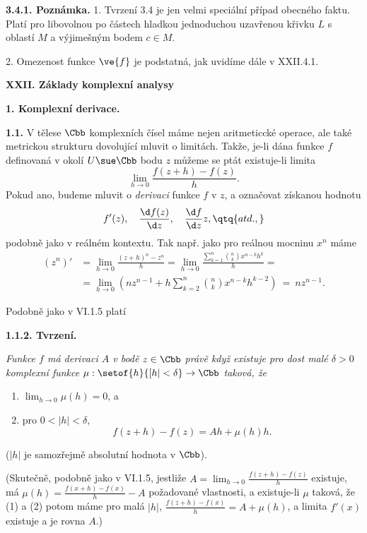 \documentclass[12pt]{article}
\begin{document}
\medskip

{\bf 3.4.1. Poznámka.} 1. Tvrzení 3.4 je jen velmi speciální případ obecného faktu. Platí  pro libovolnou po částech hladkou jednoduchou uzavřenou křivku $L$
s oblastí $M$ a výjimešným bodem $c\in M$.

2.  Omezenost funkce $\ve{f}$ je podstatná, jak uvidíme dále v
XXII.4.1.


\newpage

\centerline{\Large\bf XXII. Základy komplexní analysy} 
 
\vskip10mm

{\large\bf 1. Komplexní derivace.}
 
 \bigskip
 
 {\bf 1.1.} V tělese $\Cbb$ komplexních čísel máme nejen aritmeticcké operace, ale také metrickou strukturu 
dovolující mluvit o limitách. Takže, je-li dána funkce $f$ definovaná v okolí $U\sue\Cbb$
 bodu $z$ můžeme se ptát existuje-li limita
$$ 
 \lim_{h\to 0}\frac{f(z+h)-f(z)}{h}.
 $$ 
 Pokud ano, budeme mluvit o {\em derivaci} funkce $f$ v $z$, a označovat získanou hodnotu
 $$
 f'(z), \quad \frac{\d f(z)}{\d z}, \quad \frac{\d f}{\d z}{z}, \qtq{atd.,}
 $$
podobně jako v reálném kontextu. Tak např. jako pro reálnou mocninu $x^n$
máme
 $$
 \begin{aligned}
  (z^n)'&= \lim_{h\to 0}\frac{(z+h)^n- z^n}{h}=\lim_{h\to 0}\frac{\sum_{k=1}^n\binom{n}{k}x^{n-k}h^k}{h}=\\
 &=\lim_{h\to 0}(nz^{n-1}+h\sum_{k=2}^n\binom{n}{k}x^{n-k}h^{k-2})\ = \ nz^{n-1}.
 \end{aligned}
 $$
 
 \medskip
 
 Podobně jako v VI.1.5 platí
 
 \medskip
 
 {\bf 1.1.2. Tvrzení.} {\em Funkce $f$ má derivaci $A$ v bodě $z\in\Cbb$ právě když existuje pro dost malé  $\delta>0$ komplexní funkce $\mu:\setof{h}{[h|<\delta}\to\Cbb$  taková, že
\begin{enumerate}
\item $\lim_{h\to 0}\mu(h)=0$, a
\item pro $0<|h|<\delta$,
$$
f(z+h)-f(z)=Ah+\mu(h)h.
$$
\end{enumerate}
($|h|$ je samozřejmě absolutní hodnota v $\Cbb$).}

\smallskip

(Skutečně, podobně jako v VI.1.5, jestliže $A=\lim_{h\to 0}\frac{f(z+h)-f(z)}{h}$ existuje,  m\'a
$
\mu(h)=\frac{f(x+h)-f(x)}{h}- A
$
 požadované vlastnosti, a
existuje-li $\mu$ taková, že (1) a (2) potom máme pro malá $|h|$,
$
\frac{f(z+h)-f(x)}{h}=A+\mu(h)
$,
a limita $f'(x)$ existuje a je rovna $A$.)
\end{document}
